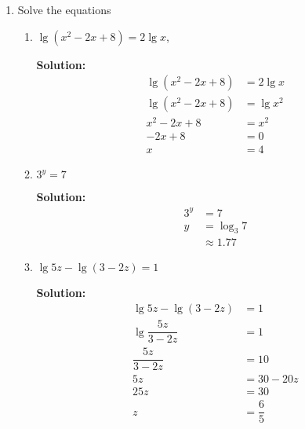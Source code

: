 \documentclass{report}
\newcommand{\sol}{\vspace{0.2cm}\textbf{Solution:}\vspace{0.2cm}}
\begin{document}
\begin{multicols*}{2}
\begin{enumerate}[leftmargin=*]
\begin{enumerate}
                  \item Solve the equations
                        \begin{enumerate}[label=(\roman*)]
                            \item $\lg \left(x^2-2 x+8\right)=2 \lg x$,

                                  \sol{}
                                  \begin{align*}
                                      \lg \left(x^2 - 2x + 8\right) & = 2 \lg x \\
                                      \lg \left(x^2 - 2x + 8\right) & = \lg x^2 \\
                                      x^2 - 2x + 8                  & = x^2     \\
                                      -2x + 8                       & = 0       \\
                                      x                             & = 4
                                  \end{align*}

                            \item $3^y=7$

                                  \sol{}
                                  \begin{align*}
                                      3^y & = 7          \\
                                      y   & = \log_3 7   \\
                                          & \approx 1.77
                                  \end{align*}

                            \item $\lg 5 z-\lg (3-2 z)=1$

                                  \sol{}
                                  \begin{align*}
                                      \lg 5z - \lg (3 - 2z)  & = 1            \\
                                      \lg \dfrac{5z}{3 - 2z} & = 1            \\
                                      \dfrac{5z}{3 - 2z}     & = 10           \\
                                      5z                     & = 30 - 20z     \\
                                      25z                    & = 30           \\
                                      z                      & = \dfrac{6}{5}
                                  \end{align*}
                        \end{enumerate}


\end{enumerate}
\end{enumerate}
\end{multicols*}
\end{document}
